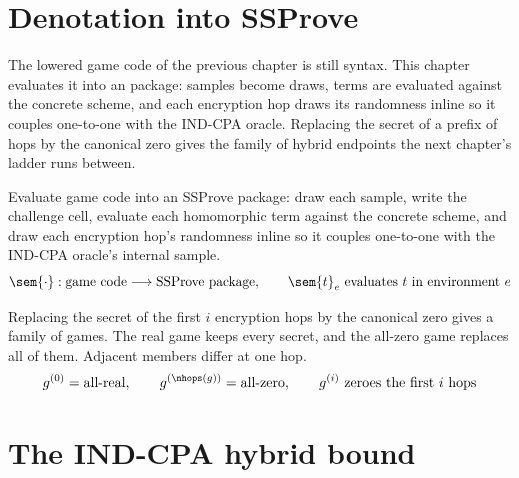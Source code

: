 \chapter{Denotation into SSProve}

The lowered game code of the previous chapter is still syntax. This chapter
evaluates it into an \ssprove{} package: samples become draws, terms are
evaluated against the concrete scheme, and each encryption hop draws its
randomness inline so it couples one-to-one with the IND-CPA oracle. Replacing the
secret of a prefix of hops by the canonical zero gives the family of hybrid
endpoints the next chapter's ladder runs between.

\begin{definition}
  \label{def:denote_game}
  \rocqok
  Evaluate game code into an SSProve package: draw each sample, write the
  challenge cell, evaluate each homomorphic term against the concrete scheme, and
  draw each encryption hop's randomness inline so it couples one-to-one with the
  IND-CPA oracle's internal sample.
  \[ \sem{\cdot} : \text{game code} \longrightarrow \text{SSProve package},
        \qquad \sem{t}_e\ \text{evaluates } t \text{ in environment } e \]
\end{definition}

\begin{definition}
  \label{def:hybrid_endpoints}
  \rocqok
  Replacing the secret of the first $i$ encryption hops by the canonical zero
  gives a family of games. The real game keeps every secret, and the all-zero
  game replaces all of them. Adjacent members differ at one hop.
  \[ g^{(0)} = \text{all-real}, \qquad g^{(\nhops(g))} = \text{all-zero}, \qquad
        g^{(i)}\ \text{zeroes the first } i \text{ hops} \]
\end{definition}

\chapter{The IND-CPA hybrid bound}

